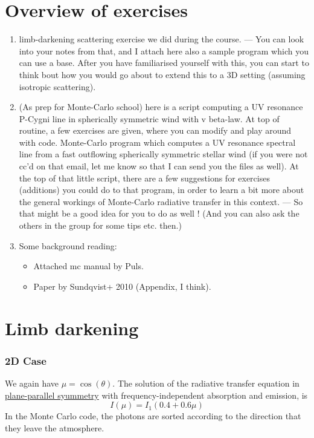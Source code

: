 \documentclass[../main/main.tex]{subfiles}
\begin{document}
\section{Overview of exercises}

\begin{enumerate}
\item limb-darkening scattering exercise we did during the course. 
— You can look into your notes from that, and I attach here also a sample program which you can use a base. After you have familiarised yourself with this, you can start to think bout how you would go about to extend this to a 3D setting (assuming isotropic scattering). 

\item (As prep for Monte-Carlo school) here is a script computing a UV resonance P-Cygni line in spherically symmetric wind with v beta-law. At top of routine, a few exercises are given, where you can modify and play around with code. Monte-Carlo program which computes a UV resonance spectral line from a fast outflowing spherically symmetric stellar wind (if you were not cc’d on that email, let me know so that I can send you the files as well). At the top of that little script, there are a few suggestions for exercises (additions) you could do to that program, in order to learn a bit more about the general workings of Monte-Carlo radiative transfer in this context.  
— So that might be a good idea for you to do as well !   (And you can also ask the others in the group for some tips etc. then.) 

\item Some background reading: 
\begin{itemize}
\item Attached mc manual by Puls. 
\item Paper by Sundqvist+ 2010 (Appendix, I think). 
\end{itemize}

\end{enumerate}

\newpage
\section{Limb darkening}

\label{limb_darkening_discussion}

\subsubsection{2D Case}
We again have $\mu = \cos(\theta)$. The solution of the radiative transfer equation in \underline{plane-parallel syummetry} with frequency-independent absorption and emission, is 
\begin{equation}
I(\mu) = I_1 (0.4 + 0.6\mu)
\end{equation}
In the Monte Carlo code, the photons are sorted according to the direction that they leave the atmosphere.
\end{document}
